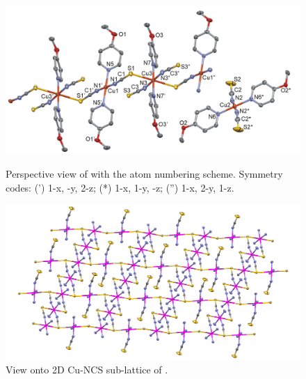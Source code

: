 \begin{figure}[htpb!]
\centering
\includegraphics[width=1\textwidth]{figures/curmop_FIGm11.png}
\caption[Perspective view of ]{Perspective view of  with the atom numbering scheme. Symmetry codes: (') 1-x, -y, 2-z; (*) 1-x, 1-y, -z; ('') 1-x, 2-y, 1-z.}
\label{fig:CuR4MOP_pv}
\vspace{\floatsep}
\includegraphics[width=1\textwidth]{figures/curmop_2D.png}
\caption{View onto 2D Cu-NCS sub-lattice of .}
\label{fig:CuR4MOP_packv}
\end{figure}




